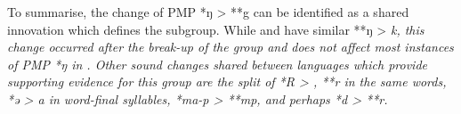 To summarise, the change of PMP *ŋ > **g can be identified as
a shared innovation which defines the  subgroup.
While  and  have similar **ŋ > \it{k},
this change occurred after the break-up of the 
group and does not affect most instances of PMP *ŋ in .
Other sound changes shared between  languages
which provide supporting evidence for this group are the split
of *R > {\0},
**r in the same words,
*ə > \it{a} in word-final syllables,
*ma-p > **mp, and perhaps *d > **r.
